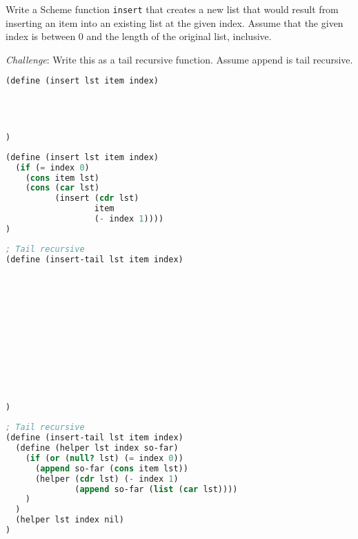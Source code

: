 \question Write a Scheme function \texttt{insert} that creates a new list that would result from inserting an item into an existing list at the given index.
Assume that the given index is between 0 and the length of the original list, inclusive.

\emph{Challenge}: Write this as a tail recursive function. Assume append is tail recursive.
\begin{blocksection}
\begin{lstlisting}[language=Scheme]
(define (insert lst item index)




)
\end{lstlisting}

\begin{solution}[0.5in]
\begin{lstlisting}[language=Scheme]
(define (insert lst item index)
  (if (= index 0)
    (cons item lst)
    (cons (car lst) 
          (insert (cdr lst) 
                  item 
                  (- index 1))))
)
\end{lstlisting}
\end{solution}
\end{blocksection}

\begin{blocksection}

\begin{lstlisting}[language=Scheme]
; Tail recursive
(define (insert-tail lst item index)












)
\end{lstlisting}

\begin{solution}
\begin{lstlisting}[language=Scheme]
; Tail recursive
(define (insert-tail lst item index)
  (define (helper lst index so-far)
    (if (or (null? lst) (= index 0))
      (append so-far (cons item lst))
      (helper (cdr lst) (- index 1)
              (append so-far (list (car lst))))
    )
  )
  (helper lst index nil)
)
\end{lstlisting}
\end{solution}
\end{blocksection}
